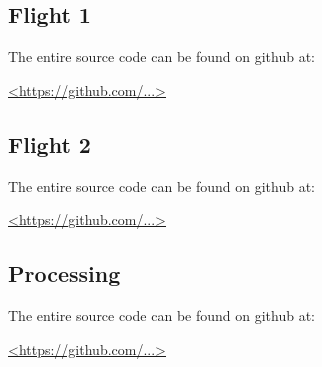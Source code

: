 \documentclass[heading.tex]{subfiles}
\begin{document}
\newpage
\appendix

\subsection{Flight 1} \label{app:Github} 

The entire source code can be found on github at:

\url{<https://github.com/...>}

\subsection{Flight 2} \label{app:Github} 

The entire source code can be found on github at:

\url{<https://github.com/...>}

\subsection{Processing} \label{app:Github} 

The entire source code can be found on github at:

\url{<https://github.com/...>}


\end{document}
